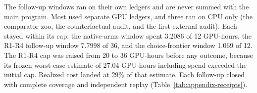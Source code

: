 The follow-up windows ran on their own ledgers and are never summed with the main program. Most used separate GPU ledgers, and three ran on CPU only (the comparator zoo, the counterfactual audit, and the first external audit). Each stayed within its cap: the native-arms window spent 3.2086 of 12 GPU-hours, the R1-R4 follow-up window 7.7998 of 36, and the choice-frontier window 1.069 of 12.
The R1-R4 cap was raised from 20 to 36 GPU-hours before any outcome, because its frozen worst-case estimate of 27.04 GPU-hours including spend exceeded the initial cap. Realized cost landed at 29\% of that estimate. Each follow-up closed with complete coverage and independent replay (Table~\ref{tab:appendix-receipts}).


